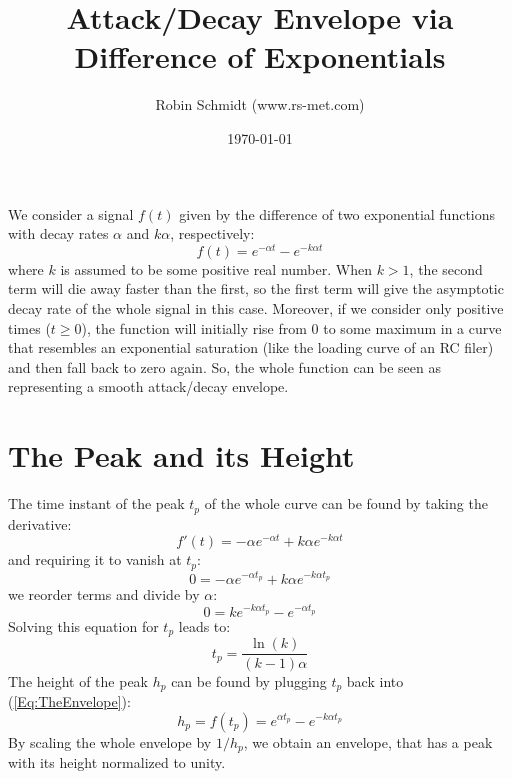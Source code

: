 \title{Attack/Decay Envelope via Difference of Exponentials}
\author{Robin Schmidt (www.rs-met.com)}
\date{\today}
\maketitle

We consider a signal $f(t)$ given by the difference of two exponential functions with decay rates $\alpha$ and $k \alpha$, respectively:
\begin{equation}
 \label{Eq:TheEnvelope}
 \boxed
 {
  f(t) = e^{-\alpha t} - e^{-k \alpha t}
 }
\end{equation}
where $k$ is assumed to be some positive real number. When $k > 1$, the second term will die away faster than the first, so the first term will give the asymptotic decay rate of the whole signal in this case. Moreover, if we consider only positive times ($t \geq 0$), the function will initially rise from $0$ to some maximum in a curve that resembles an exponential saturation (like the loading curve of an RC filer) and then fall back to zero again. So, the whole function can be seen as representing a smooth attack/decay envelope.

\section{The Peak and its Height}
The time instant of the peak $t_p$ of the whole curve can be found by taking the derivative: 
\begin{equation}
 f'(t) = -\alpha e^{-\alpha t} + k \alpha e^{-k \alpha t}
\end{equation}
and requiring it to vanish at $t_p$:
\begin{equation}
  0 = -\alpha e^{-\alpha t_p} + k \alpha e^{-k \alpha t_p}
\end{equation}
we reorder terms and divide by $\alpha$:
\begin{equation}
 \label{Eq:DerivativeMustVanish}
  0 = k e^{-k \alpha t_p} - e^{-\alpha t_p}
\end{equation}
Solving this equation for $t_p$ leads to:
\begin{equation}
 \label{Eq:TimeOfPeak}
 t_p = \frac{\ln(k)}{(k-1) \alpha}
\end{equation}
The height of the peak $h_p$ can be found by plugging $t_p$ back into (\ref{Eq:TheEnvelope}):
\begin{equation}
 \boxed
 {
  h_p = f(t_p) = e^{\alpha t_p} - e^{-k \alpha t_p}
 }
\end{equation}
By scaling the whole envelope by $1/h_p$, we obtain an envelope, that has a peak with its height normalized to unity.

